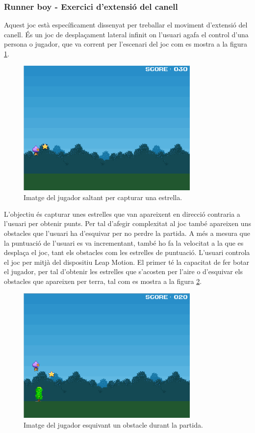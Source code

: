 \documentclass[12pt,a4paper,catalan]{article}
\begin{document}
	\subsubsection{Runner boy - Exercici d'extensió del canell}
	Aquest joc està específicament dissenyat per treballar el moviment d'extensió del canell.
	És un joc de desplaçament lateral infinit on l'usuari agafa el control d'una persona o jugador, que va corrent per l'escenari del joc com es mostra a la figura \ref{fig:runnerboy-simple}.
	\begin{figure}[H]
		\includegraphics[width=0.8\textwidth,keepaspectratio]{runner-boy-simple.png}
		\centering
		\caption{Imatge del jugador saltant per capturar una estrella.}
		\label{fig:runnerboy-simple}
	\end{figure}
	L'objectiu és capturar unes estrelles que van apareixent en direcció contraria a l'usuari per obtenir punts. Per tal d'afegir complexitat al joc també apareixen uns obstacles que l'usuari ha d'esquivar per no perdre la partida. A més a mesura que la puntuació de l'usuari es va incrementant, també ho fa la velocitat a la que es desplaça el joc, tant els obstacles com les estrelles de puntuació.
	L'usuari controla el joc per mitjà del dispositiu Leap Motion. El primer té la capacitat de fer botar el jugador, per tal d'obtenir les estrelles que s'acosten per l'aire o d'esquivar els obstacles que apareixen per terra, tal com es mostra a la figura \ref{fig:runnerboy-obstacle}.
	\begin{figure}[H]
		\includegraphics[width=0.8\textwidth,keepaspectratio]{runner-boy-obstacle.png}
		\centering
		\caption{Imatge del jugador esquivant un obstacle durant la partida.}
		\label{fig:runnerboy-obstacle}
	\end{figure}
\end{document}
